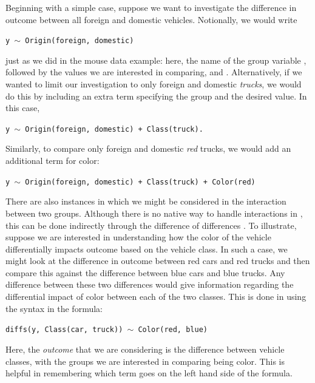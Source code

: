 Beginning with a simple case, suppose we want to investigate the difference in outcome between all foreign and domestic vehicles. Notionally, we would write

\begin{center}
\tt y $\sim$ Origin(foreign, domestic)
\end{center}

just as we did in the mouse data example: here, the name of the group variable , followed by the values we are interested in comparing,  and . Alternatively, if we wanted to limit our investigation to only foreign and domestic \textit{trucks}, we would do this by including an extra term specifying the group and the desired value. In this case, 

\begin{center}
\tt y $\sim$ Origin(foreign, domestic) + Class(truck).
\end{center}

Similarly, to compare only foreign and domestic \textit{red} trucks, we would add an additional term for color:

\begin{center}
\tt y $\sim$ Origin(foreign, domestic) + Class(truck) + Color(red)
\end{center}

There are also instances in which we might be considered in the interaction between two groups. Although there is no native way to handle interactions in , this can be done indirectly through the difference of differences \cite{McMurray2019}. To illustrate, suppose we are interested in understanding how the color of the vehicle differentially impacts outcome based on the vehicle class. In such a case, we might look at the difference in outcome between red cars and red trucks and then compare this against the difference between blue cars and blue trucks. Any difference between these two differences would give information regarding the differential impact of color between each of the two classes. This is done in  using the  syntax in the formula:


\begin{center}
\tt diffs(y, Class(car, truck)) $\sim$ Color(red, blue)
\end{center}

Here, the \textit{outcome} that we are considering is the difference between vehicle classes, with the groups we are interested in comparing being color. This is helpful in remembering which term goes on the left hand side of the formula. 

